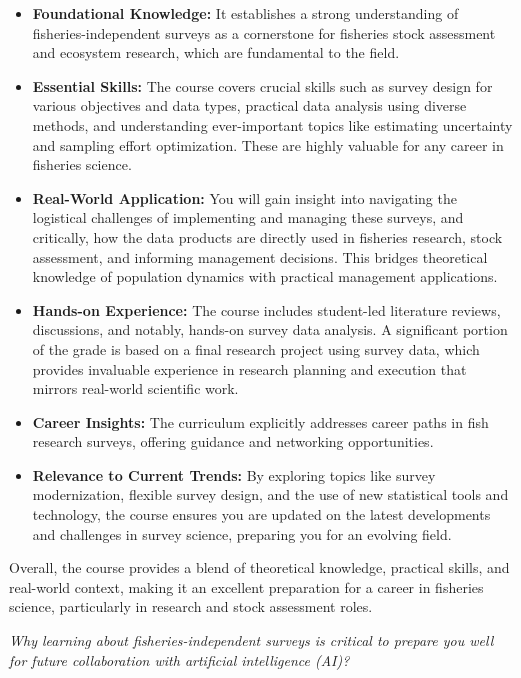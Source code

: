 \documentclass[
  letterpaper,
  oneside,
  open=any]{scrbook}
\providecommand{\tightlist}{%
  \setlength{\itemsep}{0pt}\setlength{\parskip}{0pt}}\usepackage{longtable,booktabs,array}
\begin{document}
\begin{itemize}
\tightlist
\item
  \textbf{Foundational Knowledge:} It establishes a strong understanding
  of fisheries-independent surveys as a cornerstone for fisheries stock
  assessment and ecosystem research, which are fundamental to the field.
\item
  \textbf{Essential Skills:} The course covers crucial skills such as
  survey design for various objectives and data types, practical data
  analysis using diverse methods, and understanding ever-important
  topics like estimating uncertainty and sampling effort optimization.
  These are highly valuable for any career in fisheries science.
\item
  \textbf{Real-World Application:} You will gain insight into navigating
  the logistical challenges of implementing and managing these surveys,
  and critically, how the data products are directly used in fisheries
  research, stock assessment, and informing management decisions. This
  bridges theoretical knowledge of population dynamics with practical
  management applications.
\item
  \textbf{Hands-on Experience:} The course includes student-led
  literature reviews, discussions, and notably, hands-on survey data
  analysis. A significant portion of the grade is based on a final
  research project using survey data, which provides invaluable
  experience in research planning and execution that mirrors real-world
  scientific work.
\item
  \textbf{Career Insights:} The curriculum explicitly addresses career
  paths in fish research surveys, offering guidance and networking
  opportunities.
\item
  \textbf{Relevance to Current Trends:} By exploring topics like survey
  modernization, flexible survey design, and the use of new statistical
  tools and technology, the course ensures you are updated on the latest
  developments and challenges in survey science, preparing you for an
  evolving field.
\end{itemize}

Overall, the course provides a blend of theoretical knowledge, practical
skills, and real-world context, making it an excellent preparation for a
career in fisheries science, particularly in research and stock
assessment roles.

\emph{Why learning about fisheries-independent surveys is critical to
prepare you well for future collaboration with artificial intelligence
(AI)?}
\end{document}
